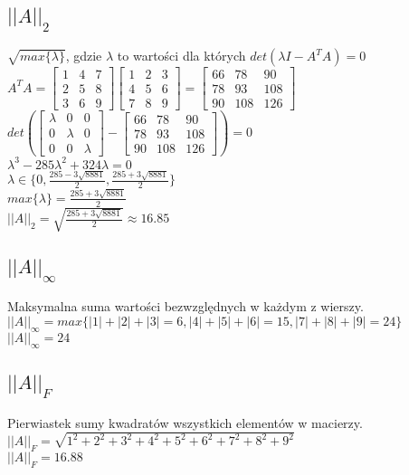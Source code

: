 \documentclass{article}
\begin{document}
\subsection{$||A||_2$}
$\sqrt{max\{\lambda\}}$, gdzie $\lambda$ to wartości dla których $det(\lambda I - A^TA)=0$\\
$A^TA=\begin{bmatrix} 1 & 4 & 7 \\ 2 & 5 & 8 \\ 3 & 6 & 9 \end{bmatrix}\begin{bmatrix} 1 & 2 & 3 \\ 4 & 5 & 6 \\ 7 & 8 & 9 \end{bmatrix}=\begin{bmatrix} 66 & 78 & 90 \\ 78 & 93 & 108 \\ 90 & 108 & 126 \end{bmatrix}$\\
$det(\begin{bmatrix} \lambda & 0 & 0 \\ 0 & \lambda & 0 \\ 0 & 0 & \lambda \end{bmatrix}-\begin{bmatrix} 66 & 78 & 90 \\ 78 & 93 & 108 \\ 90 & 108 & 126 \end{bmatrix})=0$\\
$\lambda^3-285\lambda^2+324\lambda=0$\\
$\lambda \in \{0, \frac{285-3\sqrt{8881}}{2}, \frac{285+3\sqrt{8881}}{2}\}$\\
$max\{\lambda\}=\frac{285+3\sqrt{8881}}{2}$\\
$||A||_2=\sqrt{\frac{285+3\sqrt{8881}}{2}}\approx 16.85$

\subsection{$||A||_\infty$}
Maksymalna suma wartości bezwzględnych w każdym z wierszy.\\
$||A||_\infty=max\{|1|+|2|+|3|=6, |4|+|5|+|6|=15, |7|+|8|+|9|=24\}$\\
$||A||_\infty=24$

\subsection{$||A||_F$}
Pierwiastek sumy kwadratów wszystkich elementów w macierzy.\\
$||A||_F=\sqrt{1^2+2^2+3^2+4^2+5^2+6^2+7^2+8^2+9^2}$\\
$||A||_F=16.88$
\end{document}
